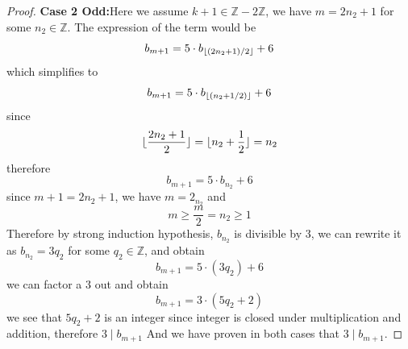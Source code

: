 \documentclass[12pt]{article}
\newcommand{\Z}{\mathbb{Z}}
\newcommand{\odd}[0]{\mathbb{Z} - 2\mathbb{Z}}
\newcommand{\paren}[1]{\left( #1 \right)}
\DeclarePairedDelimiter\floor{\lfloor}{\rfloor}
\begin{document}
\begin{enumerate}
\begin{enumerate}
\begin{proof}
                    \textbf{Case 2 Odd:}Here we assume $k+1 \in \odd$, we have $m = 2n_2+1$ for some $n_2 \in \Z$. The expression of the term would be 
                        \[
                        b_{m+1}=5 \cdot b_{\floor{\paren{2n_2+1}/2}} + 6
                        \]
                    which simplifies to
                        \[
                        b_{m+1}=5 \cdot b_{\floor{\paren{n_2+1/2}}} + 6
                        \]
                    since
                        \[
                        \floor{\frac{2n_2+1}{2}} = \floor{n_2 + \frac{1}{2}} = n_2
                        \]
                    therefore
                        \[
                        b_{m+1}=5 \cdot b_{n_2} + 6
                        \]
                    since $m+1 = 2n_2+1$, we have $m = 2_{n_2}$ and
                        \[
                        m \geq \frac{m}{2} = n_2 \geq 1
                        \]
                    Therefore by strong induction hypothesis, $b_{n_2}$ is divisible by 3, we can rewrite it as $b_{n_2} = 3q_2$ for some $q_2 \in \Z$, and obtain
                        \[
                        b_{m+1}=5 \cdot \paren{3q_2} + 6
                        \]
                    we can factor a 3 out and obtain   
                        \[
                        b_{m+1} = 3\cdot \paren{5q_2 + 2}
                        \]
                    we see that $5q_2 +2$ is an integer since integer is closed under multiplication and addition, therefore $3 \mid b_{m+1}$
                    And we have proven in both cases that $3 \mid b_{m+1}$.
                    
                \end{proof}
        \end{enumerate}


\end{enumerate}
\end{document}
